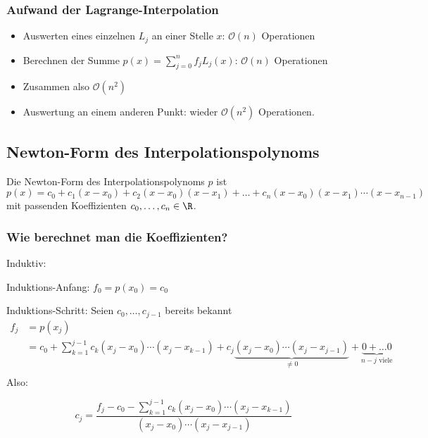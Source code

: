 \subsubsection{Aufwand der Lagrange-Interpolation}
\begin{itemize}
 \item Auswerten eines einzelnen $L_j$ an einer Stelle $x$:  $\mathcal{O}(n)$  Operationen
 \item Berechnen der Summe $\displaystyle p(x) = \sum_{j=0}^n f_jL_j(x) $: \quad $\mathcal{O}(n)$ Operationen
 \item Zusammen also $\mathcal{O}(n^2)$
 \item Auswertung an einem anderen Punkt: wieder $\mathcal{O}(n^2)$ Operationen.
\end{itemize}

\subsection{Newton-Form des Interpolationspolynoms}

\begin{definition}
 Die Newton-Form des Interpolationspolynoms $p$ ist
 \begin{equation*}
  p(x) = c_0 + c_1(x-x_0) + c_2(x-x_0)(x-x_1) + \hdots + c_n(x-x_0)(x-x_1)\cdots (x-x_{n-1})
 \end{equation*}
 mit passenden Koeffizienten $c_0,\hdots,c_n\in\R$.
\end{definition}

\subsubsection{Wie berechnet man die Koeffizienten?}

Induktiv:

\medskip

Induktions-Anfang: $f_0 = p(x_0) = c_0$

\medskip

Induktions-Schritt: Seien $c_0,\hdots,c_{j-1}$ bereits bekannt
\begin{align*}
    f_j &= p(x_j) \\
       &= c_0 + \sum_{k=1}^{j-1} c_k(x_j-x_0)\cdots (x_j-x_{k-1}) + c_j \underbrace{(x_j-x_0)\cdots (x_j-x_{j-1})}_{ \neq 0} + \underbrace{0+\hdots 0}_{n-j \text{ viele}} \\
\end{align*}
Also:

\begin{equation*}
 c_j = \frac{f_j - c_0 - \sum_{k=1}^{j-1} c_k(x_j-x_0)\cdots (x_j-x_{k-1})}{(x_j-x_0)\cdots (x_j-x_{j-1})}
\end{equation*}

